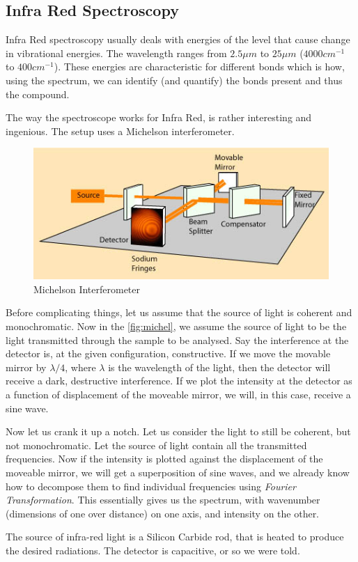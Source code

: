 \subsection{Infra Red Spectroscopy}
Infra Red spectroscopy usually deals with energies of the level that cause change in vibrational energies. The wavelength ranges from $2.5 \mu m$ to $25 \mu m$ ($4000 cm^{-1}$ to $400 cm^{-1}$). These energies are characteristic for different bonds which is how, using the spectrum, we can identify (and quantify) the bonds present and thus the compound.
\par
The way the spectroscope works for Infra Red, is rather interesting and ingenious. The setup uses a Michelson interferometer. \\
\begin{figure}[bth]
	\begin{center}
		\includegraphics[width=.8\linewidth]{gfx/michel}
	\end{center}
\caption[Michelson Interferometer]{Michelson Interferometer \citep{michel:img}}\label{fig:michel}
\end{figure}
\par
Before complicating things, let us assume that the source of light is coherent and monochromatic.  Now in the \autoref{fig:michel}, we assume the source of light to be the light transmitted through the sample to be analysed. Say the interference at the detector is, at the given configuration, constructive. If we move the movable mirror by $\lambda / 4$, where $\lambda$ is the wavelength of the light, then the detector will receive a dark, destructive interference. If we plot the intensity at the detector as a function of displacement of the moveable mirror, we will, in this case, receive a sine wave.
\par
Now let us crank it up a notch. Let us consider the light to still be coherent, but not monochromatic. Let the source of light contain all the transmitted frequencies.  Now if the intensity is plotted against the displacement of the moveable mirror, we will get a superposition of sine waves, and we already know how to decompose them to find individual frequencies using \emph{Fourier Transformation}. This essentially gives us the spectrum, with wavenumber (dimensions of one over distance) on one axis, and intensity on the other.
\par
The source of infra-red light is a Silicon Carbide rod, that is heated to produce the desired radiations.  The detector is capacitive, or so we were told. 


